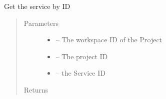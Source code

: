 \documentclass[letterpaper,10pt,english]{sphinxmanual}
\begin{document}

\begin{fulllineitems}
\label{_source/son_editor.impl:son_editor.impl.servicesimpl.get_references}
\end{fulllineitems}


\begin{fulllineitems}
\label{_source/son_editor.impl:son_editor.impl.servicesimpl.get_service}
Get the service by ID
\begin{quote}\begin{description}
\item[{Parameters}] \leavevmode\begin{itemize}
\item {} 
 -- The workspace ID of the Project

\item {} 
 -- The project ID

\item {} 
 -- the Service ID

\end{itemize}

\item[{Returns}] \leavevmode


\end{description}\end{quote}

\end{fulllineitems}

\end{document}
